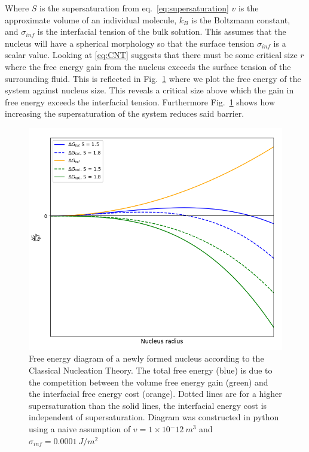 Where $S$ is the supersaturation from eq.~\eqref{eq:supersaturation} 
$v$ is the approximate volume of an individual molecule, 
$k_B$ is the Boltzmann constant, and $\sigma_{inf}$ is the 
interfacial tension of the bulk solution. This assumes that 
the nucleus will have a spherical morphology so that the 
surface tension $\sigma_{inf}$ is a scalar value. Looking at 
\eqref{eq:CNT} suggests that there must be some critical size 
$r$ where the free energy gain from the nucleus exceeds the 
surface tension of the surrounding fluid. This is reflected in 
Fig.~\ref{fig:free_energy} where we plot the free energy of the 
system against nucleus size. This reveals a critical size above 
which the gain in free energy exceeds the interfacial tension. 
Furthermore Fig.~\ref{fig:free_energy} shows how increasing the 
supersaturation of the system reduces said barrier. 
\begin{figure}[h!]
	\centering
	\includegraphics[width=\linewidth]{Free_Energy_Diagram.png}
	\caption{Free energy diagram of a newly formed nucleus according 
		to the Classical Nucleation Theory. The total free energy (blue)
		is due to the competition between the volume free energy gain
		(green) and the interfacial free energy cost (orange). Dotted
		lines are for a higher supersaturation than the solid lines,
		the interfacial energy cost is independent of supersaturation.
		Diagram was constructed in python using a naive assumption 
		of $v=1\times 10^-12\ m^3$ and $\sigma_{inf}=0.0001\ J/m^2$}
	\label{fig:free_energy}
\end{figure}

